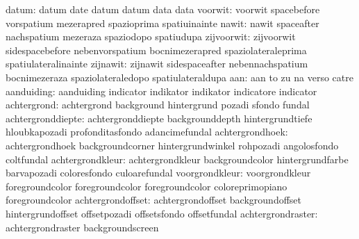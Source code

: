                     datum: datum                     date
                           datum                     datum
                           data                      data
                  voorwit: voorwit                   spacebefore
                           vorspatium                mezerapred
                           spazioprima               spatiuinainte
                    nawit: nawit                     spaceafter
                           nachspatium               mezeraza
                           spaziodopo                spatiudupa
               zijvoorwit: zijvoorwit                sidespacebefore
                           nebenvorspatium           bocnimezerapred
                           spaziolateraleprima       spatiulateralinainte
                 zijnawit: zijnawit                  sidespaceafter
                           nebennachspatium          bocnimezeraza
                           spaziolateraledopo        spatiulateraldupa
                      aan: aan                       to
                           zu                        na
                           verso                     catre
               aanduiding: aanduiding                indicator
                           indikator                 indikator
                           indicatore                indicator
              achtergrond: achtergrond               background
                           hintergrund               pozadi
                           sfondo                    fundal
        achtergronddiepte: achtergronddiepte         backgrounddepth
                           hintergrundtiefe          hloubkapozadi
                           profonditasfondo          adancimefundal
          achtergrondhoek: achtergrondhoek           backgroundcorner
                           hintergrundwinkel         rohpozadi
                           angolosfondo              coltfundal
         achtergrondkleur: achtergrondkleur          backgroundcolor
                           hintergrundfarbe          barvapozadi
                           coloresfondo              culoarefundal
           voorgrondkleur: voorgrondkleur            foregroundcolor
                           foregroundcolor           foregroundcolor
                           coloreprimopiano          foregroundcolor
         achtergrondoffset: achtergrondoffset         backgroundoffset
                           hintergrundoffset         offsetpozadi
                           offsetsfondo              offsetfundal
        achtergrondraster: achtergrondraster         backgroundscreen
